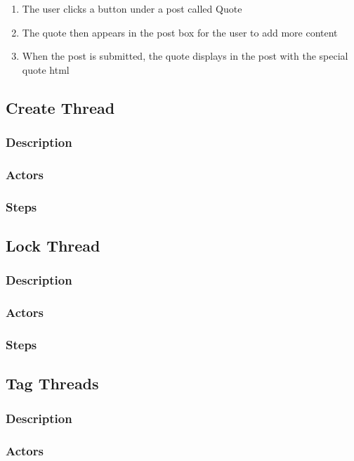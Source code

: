 \documentclass[12pt]{scrartcl}
\begin{document}
\begin{enumerate}
\item The user clicks a button under a post called Quote
\item The quote then appears in the post box for the user to add more content
\item When the post is submitted, the quote displays in the post with the special quote html
\end{enumerate}

\subsection{Create Thread}
\subsubsection{Description}
\subsubsection{Actors}
\subsubsection{Steps}

\subsection{Lock Thread}
\subsubsection{Description}
\subsubsection{Actors}
\subsubsection{Steps}

\subsection{Tag Threads}
\subsubsection{Description}
\subsubsection{Actors}
\end{document}
